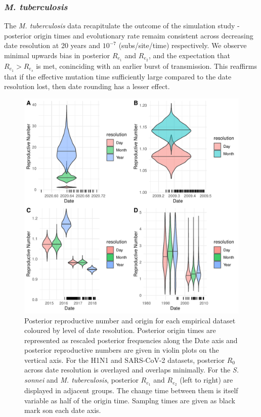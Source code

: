 \documentclass{article}
\begin{document}
\begin{spacing}{1.5}
\subsubsection*{\textit{M. tuberculosis}}
The \textit{M. tuberculosis} data recapitulate the outcome of the simulation study - posterior origin times and evolutionary rate remaim consistent across decreasing date resolution at 20 years and $10^{-7}$ (subs/site/time) respectively. We observe minimal upwards bias in posterior $R_{e_1}$ and $R_{e_2}$, and the expectation that $R_{e_1} > R_{e_s}$ is met, coninciding with an earlier burst of transmission. This reaffirms that if the effective mutation time sufficiently large compared to the date resolution lost, then date rounding has a lesser effect.


\begin{figure}[h!]
    \centering
    \includegraphics{empirical_plot.pdf}
    \caption{Posterior reproductive number and origin for each empirical dataset coloured by level of date resolution. Posterior origin times are represented as rescaled posterior frequencies along the Date axis and posterior reproductive numbers are given in violin plots on the vertical axis. For the H1N1 and SARS-CoV-2 datasets, posterior $R_0$ across date resolution is overlayed and overlaps minimally. For the \textit{S. sonnei} and \textit{M. tuberculosis}, posterior $R_{e_1}$ and $R_{e_2}$ (left to right) are displayed in adjacent groups. The change time between them is itself variable as half of the origin time. Samplng times are given as black mark son each date axis.}
    \label{fig:empR}
\end{figure}


\end{spacing}
\end{document}
